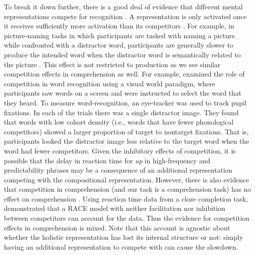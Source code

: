 \documentclass[
  authoryear,
  preprint,
  1p,
  onecolumn]{elsarticle}
\begin{document}
To break it down further, there is a good deal of evidence that
different mental representations compete for recognition
\citetext{\citealp{oppenheimLexicalCompetitionDemand2019}; \citealp[c.f.][]{staubInfluenceClozeProbability2015}}.
A representation is only activated once it receives sufficiently more
activation than its competitors
\citep{mcclellandInteractiveActivationModel1981}. For example, in
picture-naming tasks in which participants are tasked with naming a
picture while confronted with a distractor word, participants are
generally slower to produce the intended word when the distractor word
is semantically related to the picture
\citep{starreveldSemanticInterferenceOrthographic1995, schriefersExploringTimeCourse1990, mcclellandInteractiveActivationModel1981}.
This effect is not restricted to production as we see similar
competition effects in comprehension as well. For example,
\citet{magnuson2007} examined the role of competition in word
recognition using a visual world paradigm, where participants saw words
on a screen and were instructed to select the word that they heard. To
measure word-recognition, an eye-tracker was used to track pupil
fixations. In each of the trials there was a single distractor image.
They found that words with low cohort density (i.e., words that have
fewer phonological competitors) showed a larger proportion of target to
nontarget fixations. That is, participants looked the distractor image
less relative to the target word when the word had fewer competitors.
Given the inhibitory effects of competition, it is possible that the
delay in reaction time for \emph{up} in high-frequency and
predictability phrases may be a consequence of an additional
representation competing with the compositional representation. However,
there is also evidence that competition in comprehension (and our task
is a comprehension task) has no effect on comprehension
\citep{staubInfluenceClozeProbability2015}. Using reaction time data
from a cloze completion task, \citet{staubInfluenceClozeProbability2015}
demonstrated that a RACE model with neither facilitation nor inhibition
between competitors can account for the data. Thus the evidence for
competition effects in comprehension is mixed. Note that this account is
agnostic about whether the holistic representation has lost its internal
structure or not: simply having an additional representation to compete
with can cause the slowdown.
\end{document}
